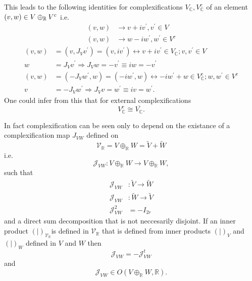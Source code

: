 \documentclass[aps,preprint]{revtex4}
\begin{document}
This leads to the following identities for complexifications $V_{\mathbb{C}%
},V_{\mathbb{C}}^{c}$ of an element $\left( v,w\right) \in V\oplus _{\mathbb{%
R}}V^{c}$ i.e. 
\begin{align}
\left( v,w\right) & \rightarrow v+iv^{\prime},v^{\prime}\in V \\
\left( v,w\right) & \rightarrow w-iw^{\prime},w^{\prime}\in V^{c}
\end{align}%
\begin{align}
\left( v,w\right) & =\left( v,J_{V}v^{\prime}\right) =\left(
v,iv^{\prime}\right) \leftrightarrow v+iv^{\prime}\in V_{\mathbb{C}%
};v,v^{\prime}\in V \\
w & =J_{V}v^{\prime}\Rightarrow J_{V}w=-v^{\prime}\equiv iw=-v^{\prime} \\
\left( v,w\right) & =\left( -J_{V}w^{\prime},w\right) =\left(
-iw^{\prime},w\right) \leftrightarrow-iw^{\prime}+w\in V_{\mathbb{C}%
}^{c};w,w^{\prime}\in V^{c} \\
v & =-J_{V}w^{\prime}\Rightarrow J_{V}v=w^{\prime}\equiv iv=w^{\prime}.
\end{align}
One could infer from this that for external complexifications 
\begin{equation}
V_{\mathbb{C}}^{c}\cong\overline{V_{\mathbb{C}}}.
\end{equation}

In fact complexification can be seen only to depend on the existance of a
complexification map $J_{VW}$ defined on 
\begin{equation}
\mathcal{V}_{\mathbb{R}}=V\oplus_{\mathbb{R}}W=\widetilde{V}+\widetilde{W}
\end{equation}
i.e.%
\begin{equation}
\mathcal{J}_{VW}:V\oplus_{\mathbb{R}}W\rightarrow V\oplus_{\mathbb{R}}W,
\end{equation}
such that 
\begin{align}
\mathcal{J}_{VW} & :\widetilde{V}\rightarrow\widetilde{W} \\
\mathcal{J}_{VW} & :\widetilde{W}\rightarrow\widetilde{V} \\
\mathcal{J}_{VW}^{2} & =-I_{2r}
\end{align}
and a direct sum decomposition that is not neccesarily disjoint. If an inner
product $\left( \left. {}\right\vert \right) _{\mathcal{V}_{\mathbb{R}}}$is
defined in $\mathcal{V}_{\mathbb{R}}$ that is defined from inner products $%
\left( \left. {}\right\vert \right) _{V}$ and $\left( \left. {}\right\vert
\right) _{W}$ defined in $V$ and $W$ then 
\begin{equation}
\mathcal{J}_{VW}=-\mathcal{J}_{VW}^{t}
\end{equation}
and 
\begin{equation}
\mathcal{J}_{VW}\in O\left( V\oplus_{\mathbb{R}}W,\mathbb{R}\right) .
\end{equation}
\end{document}
